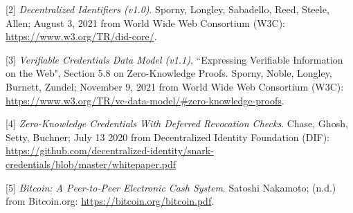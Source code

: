 \documentclass[11pt]{article}
\begin{document}
\vspace{1\baselineskip}
[2] \textit{Decentralized Identifiers (v1.0)}. Sporny, Longley, Sabadello, Reed, Steele, Allen; August 3, 2021 from World Wide Web Consortium (W3C): \url{https://www.w3.org/TR/did-core/}.

\vspace{1\baselineskip}
[3] \textit{Verifiable Credentials Data Model (v1.1)}, ``Expressing Verifiable Information on the Web", Section 5.8 on Zero-Knowledge Proofs. Sporny, Noble, Longley, Burnett, Zundel; November 9, 2021 from World Wide Web Consortium (W3C): \url{https://www.w3.org/TR/vc-data-model/#zero-knowledge-proofs}. \ \ 

\vspace{1\baselineskip}
[4] \textit{Zero-Knowledge Credentials With Deferred Revocation Checks}. Chase, Ghosh, Setty, Buchner; July 13 2020 from Decentralized Identity Foundation (DIF): \url{https://github.com/decentralized-identity/snark-credentials/blob/master/whitepaper.pdf} 

\vspace{1\baselineskip}
[5] \textit{Bitcoin: A Peer-to-Peer Electronic Cash System}. Satoshi Nakamoto; (n.d.) from Bitcoin.org: \url{https://bitcoin.org/bitcoin.pdf}. 
\end{document}
